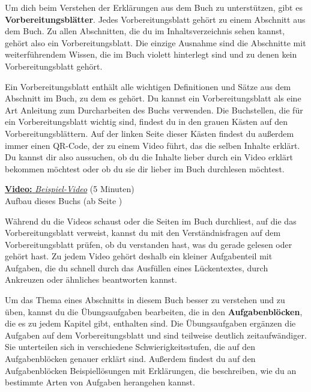\documentclass[../main.tex]{subfiles}
\begin{document}
Um dich beim Verstehen der Erklärungen aus dem Buch zu unterstützen, gibt es \textbf{Vorbereitungsblätter}. Jedes Vorbereitungsblatt gehört zu einem Abschnitt aus dem Buch. Zu allen Abschnitten, die du im Inhaltsverzeichnis sehen kannst, gehört also ein Vorbereitungsblatt. Die einzige Ausnahme sind die Abschnitte mit weiterführendem Wissen, die im Buch violett hinterlegt sind und zu denen kein Vorbereitungsblatt gehört.

Ein Vorbereitungsblatt enthält alle wichtigen Definitionen und Sätze aus dem Abschnitt im Buch, zu dem es gehört. Du kannst ein Vorbereitungsblatt als eine Art Anleitung zum Durcharbeiten des Buchs verwenden. Die Buchstellen, die für ein Vorbereitungsblatt wichtig sind, findest du in den grauen Kästen auf den Vorbereitungsblättern. Auf der linken Seite dieser Kästen findest du außerdem immer einen QR-Code, der zu einem Video führt, das die selben Inhalte erklärt. Du kannst dir also aussuchen, ob du die Inhalte lieber durch ein Video erklärt bekommen möchtest oder ob du sie dir lieber im Buch durchlesen möchtest.

\begin{video}
    \begin{minipage}{.1\textwidth}
    \end{minipage}
    \begin{minipage}{.9\textwidth}
        \href{https://themrsheldon.github.io/testing/}{\textbf{Video:} \textit{Beispiel-Video}} (5 Minuten)\\
        Aufbau dieses Buchs (ab Seite \pageref{concept})
    \end{minipage}
\end{video}

Während du die Videos schaust oder die Seiten im Buch durchliest, auf die das Vorbereitungsblatt verweist, kannst du mit den Verständnisfragen auf dem Vorbereitungsblatt prüfen, ob du verstanden hast, was du gerade gelesen oder gehört hast. Zu jedem Video gehört deshalb ein kleiner Aufgabenteil mit Aufgaben, die du schnell durch das Ausfüllen eines Lückentextes, durch Ankreuzen oder ähnliches beantworten kannst.

Um das Thema eines Abschnitts in diesem Buch besser zu verstehen und zu üben, kannst du die Übungsaufgaben bearbeiten, die in den \textbf{Aufgabenblöcken}, die es zu jedem Kapitel gibt, enthalten sind. Die Übungsaufgaben ergänzen die Aufgaben auf dem Vorbereitungsblatt und sind teilweise deutlich zeitaufwändiger. Sie unterteilen sich in verschiedene Schwierigkeitsstufen, die auf den Aufgabenblöcken genauer erklärt sind. Außerdem findest du auf den Aufgabenblöcken Beispiellösungen mit Erklärungen, die beschreiben, wie du an bestimmte Arten von Aufgaben herangehen kannst.
\end{document}
